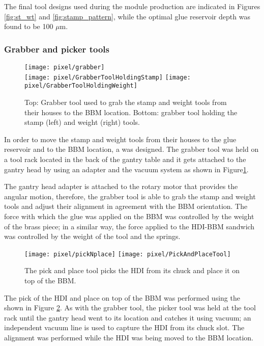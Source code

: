 The final tool designs used during the module production are indicated in Figures \ref{fig:st_wt} and \ref{fig:stamp_pattern}, while the optimal glue reservoir depth was found to be 100 $\mu$m. 

\subsubsection*{Grabber and picker tools}

\begin{figure}[!h]
  \centering  
  \texttt{[image: pixel/grabber]}\\
  \texttt{[image: pixel/GrabberToolHoldingStamp]}
  \texttt{[image: pixel/GrabberToolHoldingWeight]}
  \caption[Grabber tool.]{Top: Grabber tool used to grab the stamp and weight tools from their houses to the BBM location. Bottom: grabber tool holding the stamp (left) and weight (right) tools.}\label{fig:grabber_tool}
\end{figure}

In order to move the stamp and weight tools from their houses to the glue reservoir and to the BBM location, a  was designed. The grabber tool was held on a tool rack located in the back of the gantry table and it gets attached to the gantry head by using an adapter and the vacuum system as shown in Figure\ref{fig:grabber_tool}. 

The gantry head adapter is attached to the rotary motor that provides the angular motion, therefore, the grabber tool is able to grab the stamp and weight tools and adjust their alignment in agreement with the BBM orientation. The force with which the glue was applied on the BBM was controlled by the weight of the brass piece; in a similar way, the force applied to the HDI-BBM sandwich was controlled by the weight of the tool and the springs.                  

\begin{figure}[!h]
  \centering  
  \texttt{[image: pixel/pickNplace]}
  \texttt{[image: pixel/PickAndPlaceTool]}
  \caption[Pick and place tool.]{The pick and place tool picks the HDI from its chuck and place it on top of the BBM.}\label{fig:pandp_tool}
\end{figure}

The pick of the HDI and place on top of the BBM was performed using the  shown in Figure \ref{fig:pandp_tool}. As with the grabber tool, the picker tool was held at the tool rack until the gantry head went to its location and catches it using vacuum; an independent vacuum line is used to capture the HDI from its chuck slot. The alignment was performed while the HDI was being moved to the BBM location.

